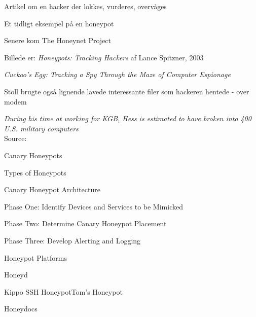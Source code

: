 \documentclass[Screen16to9,17pt]{foils}
\begin{document}


\begin{list1}
\item Artikel om en hacker der lokkes, vurderes, overvåges
\item Et tidligt eksempel på en honeypot
\item Senere kom The Honeynet Project 
\item Billede er: \emph{Honeypots: Tracking Hackers}
af Lance Spitzner, 2003
\end{list1}


\begin{list1}
\item
\emph{Cuckoo's Egg: Tracking a Spy Through the Maze of Computer
 Espionage}
 \item  Stoll brugte også lignende lavede interessante filer som hackeren hentede - over modem
\item \emph{During his time at working for KGB, Hess is estimated to have broken into 400 U.S. military computers}\\
Source: 
\end{list1}



\begin{list1}
\item Canary Honeypots
\item Types of Honeypots
\item Canary Honeypot Architecture
\begin{list2}
\item Phase One: Identify Devices and Services to be Mimicked
\item Phase Two: Determine Canary Honeypot Placement
\item Phase Three: Develop Alerting and Logging
\end{list2}
\item Honeypot Platforms
\begin{list2}
\item Honeyd
\item Kippo SSH HoneypotTom’s Honeypot
\item Honeydocs
\end{list2}
\end{list1}
\end{document}
